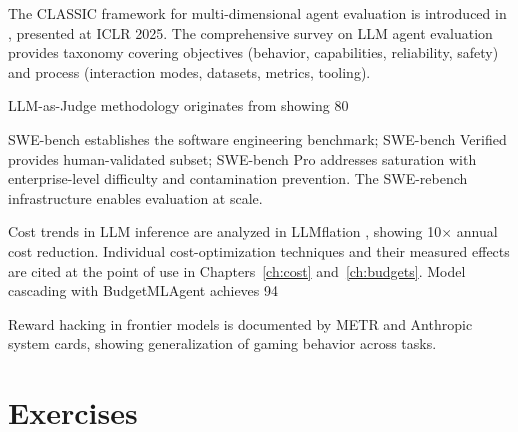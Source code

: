 The CLASSIC framework for multi-dimensional agent evaluation is introduced in \cite{classic2025}, presented at ICLR 2025. The comprehensive survey on LLM agent evaluation \cite{agentevalsurvey2025} provides taxonomy covering objectives (behavior, capabilities, reliability, safety) and process (interaction modes, datasets, metrics, tooling).

LLM-as-Judge methodology originates from \cite{llmasjudge2023} showing 80%

SWE-bench \cite{swebench2024} establishes the software engineering benchmark; SWE-bench Verified provides human-validated subset; SWE-bench Pro \cite{swebenchpro2025} addresses saturation with enterprise-level difficulty and contamination prevention. The SWE-rebench infrastructure \cite{swebenchinfra2025} enables evaluation at scale.

Cost trends in LLM inference are analyzed in LLMflation \cite{llmflation2024}, showing 10$\times$ annual cost reduction. Individual cost-optimization techniques and their measured effects are cited at the point of use in Chapters~\ref{ch:cost} and~\ref{ch:budgets}. Model cascading with BudgetMLAgent achieves 94%

Reward hacking in frontier models is documented by METR \cite{metr2025} and Anthropic system cards, showing generalization of gaming behavior across tasks.

\section*{Exercises}

